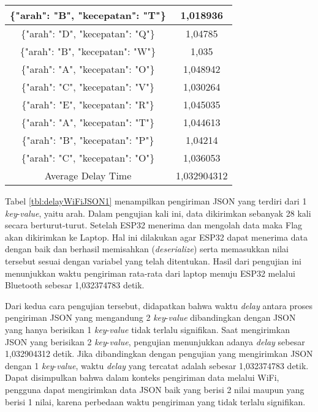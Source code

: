 \begin{table}[!ht]
\begin{tabular}{|c|c|}
  \{"arah": "B", "kecepatan": "T"\} & 1,018936    \\ \hline
  \{"arah": "D", "kecepatan": "Q"\} & 1,04785     \\ \hline
  \{"arah": "B", "kecepatan": "W"\} & 1,035       \\ \hline
  \{"arah": "A", "kecepatan": "O"\} & 1,048942    \\ \hline
  \{"arah": "C", "kecepatan": "V"\} & 1,030264    \\ \hline
  \{"arah": "E", "kecepatan": "R"\} & 1,045035    \\ \hline
  \{"arah": "A", "kecepatan": "T"\} & 1,044613    \\ \hline
  \{"arah": "B", "kecepatan": "P"\} & 1,04214     \\ \hline
  \{"arah": "C", "kecepatan": "O"\} & 1,036053    \\ \hline
  Average Delay Time                & 1,032904312 \\ \hline
  \end{tabular}
  \end{table}

Tabel \ref{tbl:delayWiFiJSON1} menampilkan pengiriman JSON yang terdiri dari 1 \emph{key}-\emph{value}, yaitu arah. Dalam pengujian kali ini, data dikirimkan sebanyak 28 kali secara berturut-turut. Setelah ESP32 menerima dan mengolah data maka Flag akan dikirimkan ke Laptop. Hal ini dilakukan agar ESP32 dapat menerima data dengan baik dan berhasil memisahkan (\emph{deserialize}) serta memasukkan nilai tersebut sesuai dengan variabel yang telah ditentukan. Hasil dari pengujian ini menunjukkan waktu pengiriman rata-rata dari laptop menuju ESP32 melalui Bluetooth sebesar 1,032374783 detik.

Dari kedua cara pengujian tersebut, didapatkan bahwa waktu \emph{delay} antara proses pengiriman JSON yang mengandung 2 \emph{key}-\emph{value} dibandingkan dengan JSON yang hanya berisikan 1 \emph{key}-\emph{value} tidak terlalu signifikan. Saat mengirimkan JSON yang berisikan 2 \emph{key}-\emph{value}, pengujian menunjukkan adanya \emph{delay} sebesar 1,032904312 detik. Jika dibandingkan dengan pengujian yang mengirimkan JSON dengan 1 \emph{key}-\emph{value}, waktu \emph{delay} yang tercatat adalah sebesar 1,032374783 detik. Dapat disimpulkan bahwa dalam konteks pengiriman data melalui WiFi, pengguna dapat mengirimkan data JSON baik yang berisi 2 nilai maupun yang berisi 1 nilai, karena perbedaan waktu pengiriman yang tidak terlalu signifikan.

